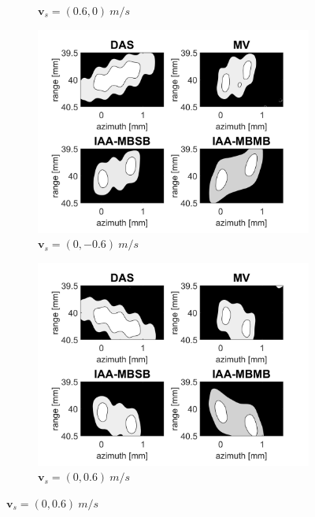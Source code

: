 \begin{figure}[ht]
\begin{subfigure}[t]{0.48\linewidth}
        \caption{$\boldsymbol{v}_s = (0.6, 0)~m/s$}
        \label{fig:mla_b}
    \end{subfigure}
    \quad
    \begin{subfigure}[t]{0.48\linewidth}
        \includegraphics[width=\linewidth]{./images/results/4/motion_90_-06.png}
        \caption{$\boldsymbol{v}_s = (0, -0.6)~m/s$}
        \label{fig:mla_c}
    \end{subfigure}
    \quad
    \begin{subfigure}[t]{0.48\linewidth}
        \includegraphics[width=\linewidth]{./images/results/4/motion_90_06.png}
        \caption{$\boldsymbol{v}_s = (0, 0.6)~m/s$}
        \label{fig:mla_d}
    \end{subfigure}

\end{figure}
